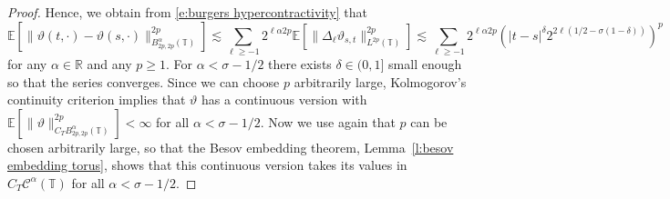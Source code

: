 \documentclass[11pt,a4paper]{article}
\newcommand{\mathD}{\mathrm{D}}
\newcommand{\tmop}[1]{\ensuremath{\operatorname{#1}}}
\theoremstyle{remark}
\newcommand{\R}{\mathbb{R}}
\newcommand{\E}{\mathbb{E}}
\newcommand{\CC}{\ensuremath{\mathscr{C}}}
\begin{document}
\begin{proof}
   Hence, we obtain from \eqref{e:burgers hypercontractivity} that
   \[
      \E[\lVert \vartheta(t, \cdot) - \vartheta(s,\cdot)\rVert_{B^\alpha_{2p,2p}(\mathbb{T})}^{2p} ] \lesssim \sum_{\ell \geqslant -1} 2^{\ell \alpha 2p} \E [\lVert \Delta_\ell \vartheta_{s,t}\rVert_{L^{2p}(\mathbb{T})}^{2p} ] \lesssim \sum_{\ell \geqslant -1} 2^{\ell \alpha 2p} \left(|t-s|^{\delta} 2^{2\ell(1/2 - \sigma (1-\delta))}\right)^p
   \]
   for any $\alpha \in \R$ and any $p \geqslant 1$. For $\alpha < \sigma - 1/2$ there exists $\delta \in (0,1]$ small enough so that the series converges. Since we can choose $p$ arbitrarily large, Kolmogorov's continuity criterion %
   implies that $\vartheta$ has a continuous version with $\E[ \|\vartheta \|_{C_T B^{\alpha}_{2 p, 2 p}(\mathbb{T})}^{2p}]< \infty$ for all $\alpha < \sigma - 1/2$. Now we use again that $p$ can be chosen arbitrarily large, so that the Besov embedding theorem, Lemma~\ref{l:besov embedding torus}, shows that this continuous version takes its values in $C_T \CC^{\alpha}(\mathbb{T})$ for all $\alpha < \sigma - 1/2$.
\end{proof}

%
\end{document}
